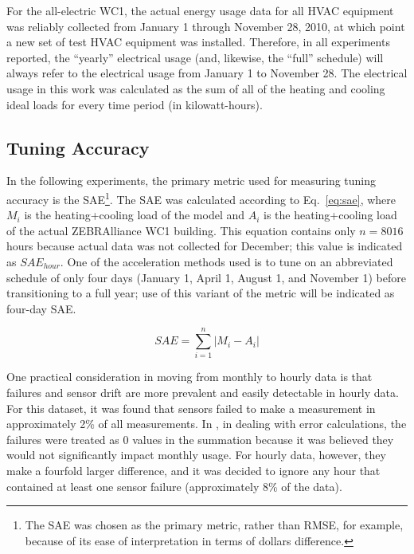 \documentclass[preprint, review, 12pt]{elsarticle}
\begin{document}
For the all-electric WC1, the actual energy usage data for all HVAC equipment was reliably collected from January 1 through November 28, 2010, at which point a new set of test HVAC equipment was installed. Therefore, in all experiments reported, the ``yearly'' electrical usage (and, likewise, the ``full'' schedule) will always refer to the electrical usage from January 1 to November 28. The electrical usage in this work was calculated as the sum of all of the heating and cooling ideal loads for every time period (in kilowatt-hours).

\subsection{Tuning Accuracy}
In the following experiments, the primary metric used for measuring tuning accuracy is the SAE\footnote{The SAE was chosen as the primary metric, rather than RMSE, for example, because of its ease of interpretation in terms of dollars difference.}. The SAE was calculated according to Eq.~\ref{eq:sae}, where $M_i$ is the heating+cooling load of the model and $A_i$ is the heating+cooling load of the actual ZEBRAlliance WC1 building. This equation contains only  $n=8016$ hours because actual data was not collected for December; this value is indicated as $SAE_{hour}$. One of the acceleration methods used is to tune on an abbreviated schedule of only four days (January 1, April 1, August 1, and November 1) before transitioning to a full year; use of this variant of the metric will be indicated as four-day SAE.

\begin{equation}
\label{eq:sae}
	SAE = \sum_{i=1}^{n}\left|M_i - A_i\right|
\end{equation}

One practical consideration in moving from monthly to hourly data is that failures and sensor drift are more prevalent and easily detectable in hourly data. For this dataset, it was found that sensors failed to make a measurement in approximately 2\% of all measurements. In \cite{cit:garrett2013}, in dealing with error calculations, the failures were treated as 0 values in the summation because it was believed they would not significantly impact monthly usage. For hourly data, however, they make a fourfold larger difference, and it was decided to ignore any hour that contained at least one sensor failure (approximately 8\% of the data).
\end{document}
